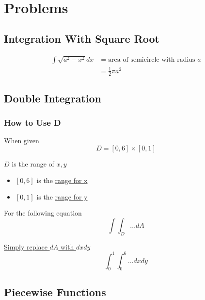 \section{Problems}

  \subsection{Integration With Square Root}

    \begin{align*}
      \int \sqrt{a^{2} - x^{2}} dx &= \text{area of semicircle with radius } a \\
      &= \frac{1}{2} \pi a^{2}
    \end{align*}

  \subsection{Double Integration}

    \subsubsection{How to Use D}

      When given
      \begin{displaymath}
        D = \left[ 0, 6 \right] \times \left[ 0, 1 \right]
      \end{displaymath}

      $ D $ is the range of $ x, y $

      \begin{itemize}
        \item $ \left[ 0, 6 \right] $ is the \ul{range for x}
        \item $ \left[ 0, 1 \right] $ is the \ul{range for y}
      \end{itemize}

      For the following equation
      \begin{displaymath}
        \int \int_{D} ... dA
      \end{displaymath}

      \ul{Simply replace $ dA $ with $ dx dy $}
      \begin{displaymath}
        \int_{0}^{1} \int_{0}^{6} ... dx dy
      \end{displaymath}

  \subsection{Piecewise Functions}


